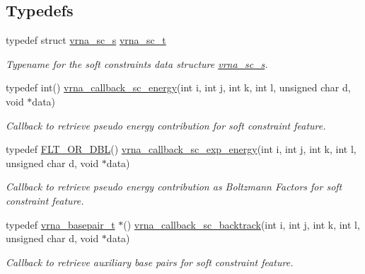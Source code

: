 \subsection*{Typedefs}
\begin{DoxyCompactItemize}
\item 
typedef struct \mbox{\hyperlink{group__soft__constraints_structvrna__sc__s}{vrna\+\_\+sc\+\_\+s}} \mbox{\hyperlink{group__soft__constraints_ga75401ce219ef8dbcceb672db82d434c6}{vrna\+\_\+sc\+\_\+t}}
\begin{DoxyCompactList}\small\item\em Typename for the soft constraints data structure \mbox{\hyperlink{group__soft__constraints_structvrna__sc__s}{vrna\+\_\+sc\+\_\+s}}. \end{DoxyCompactList}\item 
typedef int() \mbox{\hyperlink{group__soft__constraints_ga88a266695d9e25cc12114dceb7b4565e}{vrna\+\_\+callback\+\_\+sc\+\_\+energy}}(int i, int j, int k, int l, unsigned char d, void $\ast$data)
\begin{DoxyCompactList}\small\item\em Callback to retrieve pseudo energy contribution for soft constraint feature. \end{DoxyCompactList}\item 
typedef \mbox{\hyperlink{group__data__structures_ga31125aeace516926bf7f251f759b6126}{F\+L\+T\+\_\+\+O\+R\+\_\+\+D\+BL}}() \mbox{\hyperlink{group__soft__constraints_ga4099978d410513edeeff8f3db13144c5}{vrna\+\_\+callback\+\_\+sc\+\_\+exp\+\_\+energy}}(int i, int j, int k, int l, unsigned char d, void $\ast$data)
\begin{DoxyCompactList}\small\item\em Callback to retrieve pseudo energy contribution as Boltzmann Factors for soft constraint feature. \end{DoxyCompactList}\item 
typedef \mbox{\hyperlink{group__data__structures_gac8c5669d3fb813cacf506489689305ce}{vrna\+\_\+basepair\+\_\+t}} $\ast$() \mbox{\hyperlink{group__soft__constraints_gaeb6448da6c593d4c489c7fbadcb99499}{vrna\+\_\+callback\+\_\+sc\+\_\+backtrack}}(int i, int j, int k, int l, unsigned char d, void $\ast$data)
\begin{DoxyCompactList}\small\item\em Callback to retrieve auxiliary base pairs for soft constraint feature. \end{DoxyCompactList}\end{DoxyCompactItemize}
